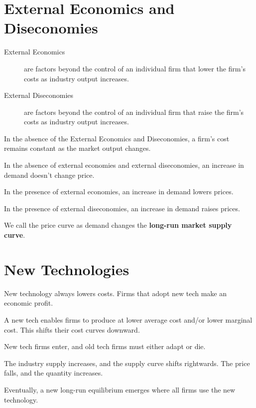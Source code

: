             \section{External Economics and Diseconomies} %
            \label{sec:external_economics_and_diseconomies}
                \begin{description}
                    \item[External Economics] are factors beyond the control of an individual firm that lower the firm's costs as industry output increases.
                    \item[External Diseconomies] are factors beyond the control of an individual firm that raise the firm's costs as industry output increases.
                \end{description}
                In the absence of the External Economics and Diseconomies, a firm's cost remains constant as the market output changes.

                In the absence of external economies and external diseconomies, an increase in demand doesn't change price.

                In the presence of external economies, an increase in demand lowers prices.

                In the presence of external diseconomies, an increase in demand raises prices.

                We call the price curve as demand changes the \textbf{long-run market supply curve}.
            \section{New Technologies} %
            \label{sec:new_technologies}
                New technology always lowers costs.
                Firms that adopt new tech make an economic profit.

                A new tech enables firms to produce at lower average cost and/or lower marginal cost.
                This shifts their cost curves downward.

                New tech firms enter, and old tech firms must either adapt or die.

                The industry supply increases, and the supply curve shifts rightwards.
                The price falls, and the quantity increases.

                Eventually, a new long-run equilibrium emerges where all firms use the new technology.
